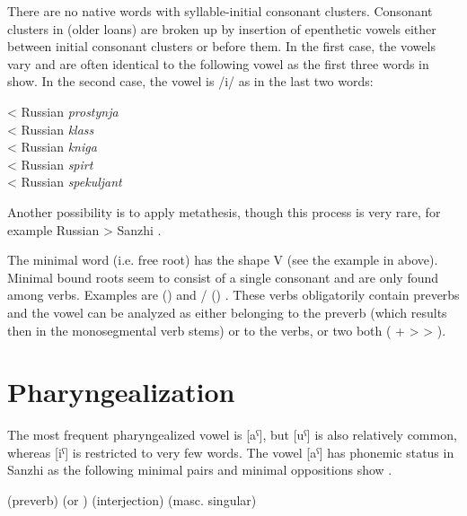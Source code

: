 There are no native words with syllable-initial consonant clusters. Consonant clusters in (older loans) are broken up by insertion of epenthetic vowels either between initial consonant clusters or before them. In the first case, the vowels vary and are often identical to the following vowel as the first three words in  show. In the second case, the vowel is /i/ as in the last two words:
%
\begin{exe}
	\ex	\label{ex:epenthesis phon}
	\TabPositions{11em}
	 	\tab 	< Russian \textit{prostynja}	\\
		 	\tab 	< Russian \textit{klass}	\\
		 		\tab 	< Russian \textit{kniga}	\\
		 	\tab < Russian \textit{spirt} \\
				  \tab  < Russian \textit{spekuljant} 		
\end{exe}

Another possibility is to apply metathesis, though this process is very rare, for example Russian  > Sanzhi  .

The minimal word (i.e. free root) has the shape V (see the example in  above). Minimal bound roots seem to consist of a single consonant and are only found among verbs. Examples are  ()  and \slash{} () . These verbs obligatorily contain preverbs and the vowel can be analyzed as either belonging to the preverb (which results then in the monosegmental verb stems) or to the verbs, or two both ( +  >  > ).



\section{Pharyngealization}
\label{sec:Pharyngealization}

The most frequent pharyngealized vowel is [aˁ], but [uˁ] is also relatively common, whereas [iˁ] is restricted to very few words. The vowel [aˁ] has phonemic status in Sanzhi as the following minimal pairs and minimal oppositions show .
%
\begin{exe}
	\ex	\label{ex:pharyngealization minimal pairs A phon@A}
	\begin{xlist}
\TabPositions{13em}
		\ex	{}  \tab {} 
		\ex	{} (preverb)  \tab {} 
		\ex	{}  \tab {} 
		\ex	{} (or ) (interjection) \tab {}  (masc. singular)
		\ex	{}  \tab {} 
		\ex	{}  \tab {} 
	\end{xlist}
\end{exe}

